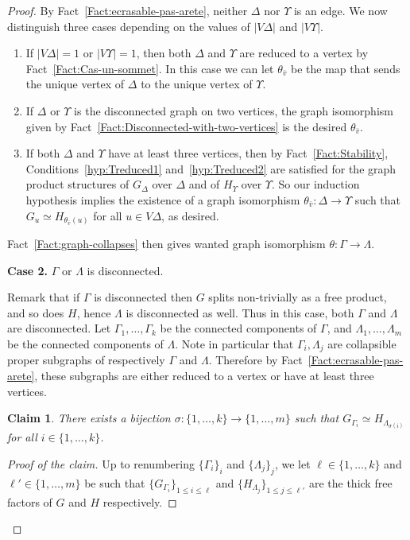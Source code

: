 \documentclass[a4paper,english,11pt]{article}
\newtheorem{claim}[de]{Claim}
\theoremstyle{definition}
\theoremstyle{remark}
\begin{document}
\begin{proof}
By Fact~\ref{Fact:ecrasable-pas-arete}, neither $\Delta$ nor $\Upsilon$ is an edge. We now distinguish three cases depending on the values of $|V\Delta|$ and $|V\Upsilon|$.
\begin{enumerate}
    \item If $|V\Delta|=1$ or $|V\Upsilon|=1$, then both $\Delta$ and $\Upsilon$ are reduced to a vertex by Fact~\ref{Fact:Cas-un-sommet}. In this case we can let $\theta_{\bar{v}}$ be the map that sends the unique vertex of $\Delta$ to the unique vertex of $\Upsilon$.
    \item If $\Delta$ or $\Upsilon$ is the disconnected graph on two vertices, the graph isomorphism given by Fact~\ref{Fact:Disconnected-with-two-vertices} is the desired $\theta_{\bar{v}}$.
    \item If both $\Delta$ and $\Upsilon$ have at least three vertices, then by Fact~\ref{Fact:Stability}, Conditions~\ref{hyp:Treduced1} and~\ref{hyp:Treduced2} are satisfied for the graph product structures of $G_\Delta$ over $\Delta$ and of $H_\Upsilon$ over $\Upsilon$.
    So our induction hypothesis implies the existence of a graph isomorphism $\theta_{\bar{v}}:\Delta \rightarrow \Upsilon$ such that $G_u\simeq H_{\theta_{\bar v}(u)}$ for all $u\in V\Delta$, as desired.
\end{enumerate}
Fact~\ref{Fact:graph-collapses} then gives wanted graph isomorphism $\theta:\Gamma\rightarrow \Lambda$. 
\medskip

\textbf{Case 2.} $\Gamma$ or $\Lambda$ is disconnected.
\smallskip

Remark that if $\Gamma$ is disconnected then $G$ splits non-trivially as a free product, and so does $H$, hence $\Lambda$ is disconnected as well. Thus in this case, both $\Gamma$ and $\Lambda$ are disconnected.
Let $\Gamma_1,\dots,\Gamma_k$ be the connected components of $\Gamma$, and $\Lambda_1,\dots,\Lambda_m$ be the connected components of $\Lambda$.
Note in particular that $\Gamma_i,\Lambda_j$ are collapsible proper subgraphs of respectively $\Gamma$ and $\Lambda$. Therefore by Fact~\ref{Fact:ecrasable-pas-arete}, these subgraphs are either reduced to a vertex or have at least three vertices.

\begin{claim} 
There exists a bijection $\sigma:\{1,\dots,k\}\to\{1,\dots,m\}$ such that $G_{\Gamma_i}\simeq H_{\Lambda_{\sigma(i)}}$ for all $i\in\{1,\dots,k\}$. 
\end{claim}

\begin{proof}[Proof of the claim]
Up to renumbering $\{\Gamma_i\}_i$ and $\{\Lambda_j\}_j$, we let $\ell\in \{1,\dots,k\}$ and $\ell' \in \{1,\dots,m\}$ be such that $\{G_{\Gamma_i}\}_{1\leq i\leq \ell}$ and $\{H_{\Lambda_j}\}_{1\leq j\leq \ell'}$ are the thick free factors of $G$ and $H$ respectively.


\end{proof}
\end{proof}
\end{document}
